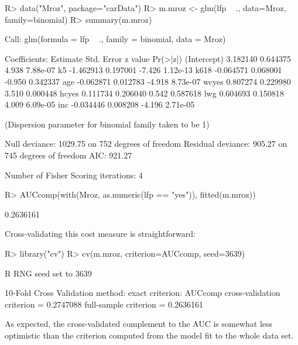 \documentclass[
]{jss}
\begin{document}
\begin{CodeChunk}
\begin{CodeInput}
R> data("Mroz", package="carData")
R> m.mroz <- glm(lfp ~ ., data=Mroz, family=binomial)
R> summary(m.mroz)
\end{CodeInput}
\begin{CodeOutput}

Call:
glm(formula = lfp ~ ., family = binomial, data = Mroz)

Coefficients:
             Estimate Std. Error z value Pr(>|z|)
(Intercept)  3.182140   0.644375   4.938 7.88e-07
k5          -1.462913   0.197001  -7.426 1.12e-13
k618        -0.064571   0.068001  -0.950 0.342337
age         -0.062871   0.012783  -4.918 8.73e-07
wcyes        0.807274   0.229980   3.510 0.000448
hcyes        0.111734   0.206040   0.542 0.587618
lwg          0.604693   0.150818   4.009 6.09e-05
inc         -0.034446   0.008208  -4.196 2.71e-05

(Dispersion parameter for binomial family taken to be 1)

    Null deviance: 1029.75  on 752  degrees of freedom
Residual deviance:  905.27  on 745  degrees of freedom
AIC: 921.27

Number of Fisher Scoring iterations: 4
\end{CodeOutput}
\begin{CodeInput}
R> AUCcomp(with(Mroz, as.numeric(lfp == "yes")), fitted(m.mroz))
\end{CodeInput}
\begin{CodeOutput}
[1] 0.2636161
\end{CodeOutput}
\end{CodeChunk}

Cross-validating this cost measure is straightforward:

\begin{CodeChunk}
\begin{CodeInput}
R> library("cv")
R> cv(m.mroz, criterion=AUCcomp, seed=3639)
\end{CodeInput}
\begin{CodeOutput}
R RNG seed set to 3639
\end{CodeOutput}
\begin{CodeOutput}
10-Fold Cross Validation
method: exact
criterion: AUCcomp
cross-validation criterion = 0.2747088
full-sample criterion = 0.2636161 
\end{CodeOutput}
\end{CodeChunk}

As expected, the cross-validated complement to the AUC is somewhat less
optimistic than the criterion computed from the model fit to the whole
data set.
\end{document}
